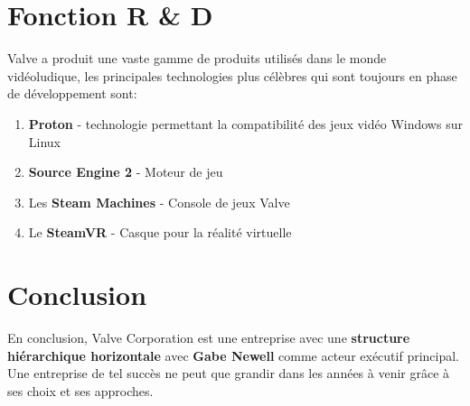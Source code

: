 \documentclass[12pt]{article}
\begin{document}
	\newpage
	\section{Fonction R \& D}
	Valve a produit une vaste gamme de produits utilisés dans le monde vidéoludique, les principales technologies plus célèbres qui sont toujours en phase de développement sont:
	\begin{enumerate}
		\item \textbf{Proton} - technologie permettant la compatibilité des jeux vidéo Windows sur Linux
		\item \textbf{Source Engine 2} - Moteur de jeu
		\item Les \textbf{Steam Machines} - Console de jeux Valve
		\item Le \textbf{SteamVR} - Casque pour la réalité virtuelle
	\end{enumerate}

	\section{Conclusion}
    En conclusion, Valve Corporation est une entreprise avec une \textbf{structure hiérarchique horizontale} avec \textbf{Gabe Newell} comme acteur exécutif principal. Une entreprise de tel succès ne peut que grandir dans les années à venir grâce à ses choix et ses approches.

	\newpage
	\printbibliography[heading=bibintoc,title={Sitographie}]
\end{document}
